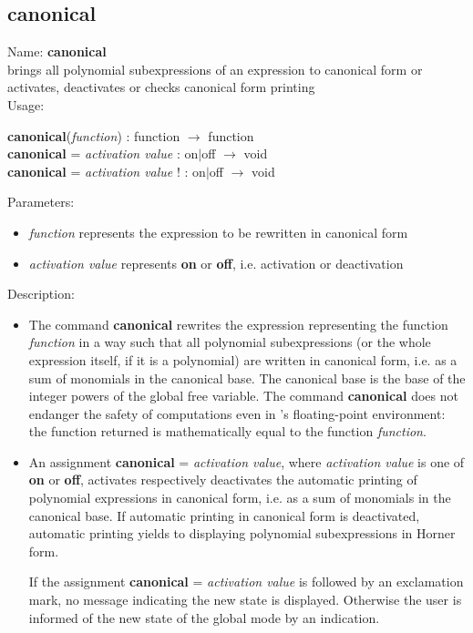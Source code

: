\subsection{canonical}
\label{labcanonical}
\noindent Name: \textbf{canonical}\\
brings all polynomial subexpressions of an expression to canonical form or activates, deactivates or checks canonical form printing\\
\noindent Usage: 
\begin{center}
\textbf{canonical}(\emph{function}) : \textsf{function} $\rightarrow$ \textsf{function}\\
\textbf{canonical} = \emph{activation value} : \textsf{on$|$off} $\rightarrow$ \textsf{void}\\
\textbf{canonical} = \emph{activation value} ! : \textsf{on$|$off} $\rightarrow$ \textsf{void}\\
\end{center}
Parameters: 
\begin{itemize}
\item \emph{function} represents the expression to be rewritten in canonical form
\item \emph{activation value} represents \textbf{on} or \textbf{off}, i.e. activation or deactivation
\end{itemize}
\noindent Description: \begin{itemize}

\item The command \textbf{canonical} rewrites the expression representing the function
   \emph{function} in a way such that all polynomial subexpressions (or the
   whole expression itself, if it is a polynomial) are written in
   canonical form, i.e. as a sum of monomials in the canonical base. The
   canonical base is the base of the integer powers of the global free
   variable. The command \textbf{canonical} does not endanger the safety of
   computations even in \sollya's floating-point environment: the
   function returned is mathematically equal to the function \emph{function}.

\item An assignment \textbf{canonical} = \emph{activation value}, where \emph{activation value}
   is one of \textbf{on} or \textbf{off}, activates respectively deactivates the
   automatic printing of polynomial expressions in canonical form,
   i.e. as a sum of monomials in the canonical base. If automatic
   printing in canonical form is deactivated, automatic printing yields to
   displaying polynomial subexpressions in Horner form.
    
   If the assignment \textbf{canonical} = \emph{activation value} is followed by an
   exclamation mark, no message indicating the new state is
   displayed. Otherwise the user is informed of the new state of the
   global mode by an indication.
\end{itemize}
